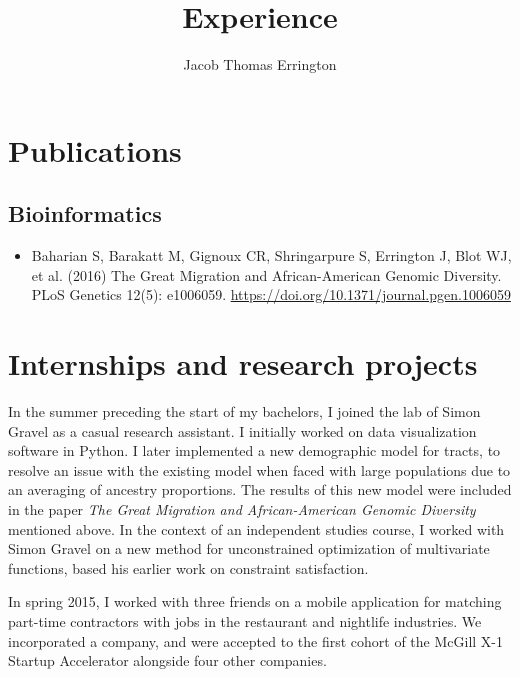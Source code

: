 \documentclass[11pt,letterpaper]{article}
\author{Jacob Thomas Errington}
\title{Experience}
\date{}
\begin{document}
\maketitle

\section{Publications}

\subsection{Bioinformatics}

\begin{itemize}
  \item
    Baharian S, Barakatt M, Gignoux CR, Shringarpure S, Errington J, Blot WJ,
    et al. (2016) The Great Migration and African-American Genomic Diversity.
    PLoS Genetics 12(5): e1006059.
    \url{https://doi.org/10.1371/journal.pgen.1006059}
\end{itemize}

\section{Internships and research projects}

In the summer preceding the start of my bachelors, I joined the lab of Simon
Gravel\footnotemark{} as a casual research assistant.
%
%
%
I initially worked on data visualization software in Python. I later
implemented a new demographic model for tracts,\footnotemark{} to resolve an
issue with the existing model when faced with large populations due to an
averaging of ancestry proportions.
%
%
%
The results of this new model were included in the paper \emph{The Great
Migration and African-American Genomic Diversity} mentioned above.
In the context of an independent studies course, I worked with Simon Gravel on
a new method for unconstrained optimization of multivariate functions, based
his earlier work\footnotemark{} on constraint satisfaction.
%

In spring 2015, I worked with three friends on a mobile application for
matching part-time contractors with jobs in the restaurant and nightlife
industries. We incorporated a company, and were accepted to the first cohort of
the McGill X-1 Startup Accelerator\footnotemark{} alongside four other companies.
%
\end{document}
